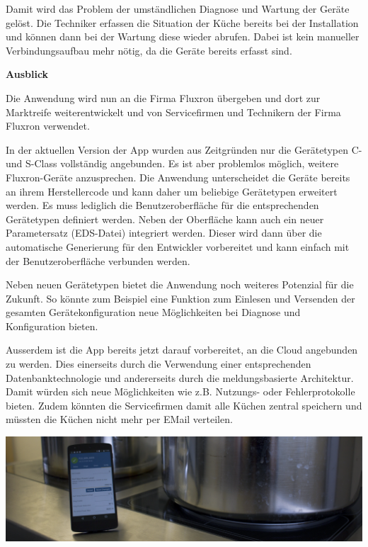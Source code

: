 Damit wird das Problem der umständlichen Diagnose und Wartung der Geräte gelöst. Die Techniker erfassen die Situation der Küche bereits bei der Installation und können dann bei der Wartung diese wieder abrufen. Dabei ist kein manueller Verbindungsaufbau mehr nötig, da die Geräte bereits erfasst sind.

\pagebreak

\textbf{Ausblick}

Die Anwendung wird nun an die Firma Fluxron übergeben und dort zur Marktreife weiterentwickelt und von Servicefirmen und Technikern der Firma Fluxron verwendet.

In der aktuellen Version der App wurden aus Zeitgründen nur die Gerätetypen C- und S-Class vollständig angebunden. Es ist aber problemlos möglich, weitere Fluxron-Geräte anzusprechen. Die Anwendung unterscheidet die Geräte bereits an ihrem Herstellercode und kann daher um beliebige Gerätetypen erweitert werden. Es muss lediglich die Benutzeroberfläche für die entsprechenden Gerätetypen definiert werden. Neben der Oberfläche kann auch ein neuer Parametersatz (EDS-Datei) integriert werden. Dieser wird dann über die automatische Generierung für den Entwickler vorbereitet und kann einfach mit der Benutzeroberfläche verbunden werden.

Neben neuen Gerätetypen bietet die Anwendung noch weiteres Potenzial für die Zukunft. So könnte zum Beispiel eine Funktion zum Einlesen und Versenden der gesamten Gerätekonfiguration neue Möglichkeiten bei Diagnose und Konfiguration bieten.

Ausserdem ist die App bereits jetzt darauf vorbereitet, an die Cloud angebunden zu werden. Dies einerseits durch die Verwendung einer entsprechenden Datenbanktechnologie und andererseits durch die meldungsbasierte Architektur. Damit würden sich neue Möglichkeiten wie z.B. Nutzungs- oder Fehlerprotokolle bieten. Zudem könnten die Servicefirmen damit alle Küchen zentral speichern und müssten die Küchen nicht mehr per EMail verteilen.

\vspace{1.4cm}

\includegraphics[trim={0 0 36 0},clip]{start/img/img_7670}